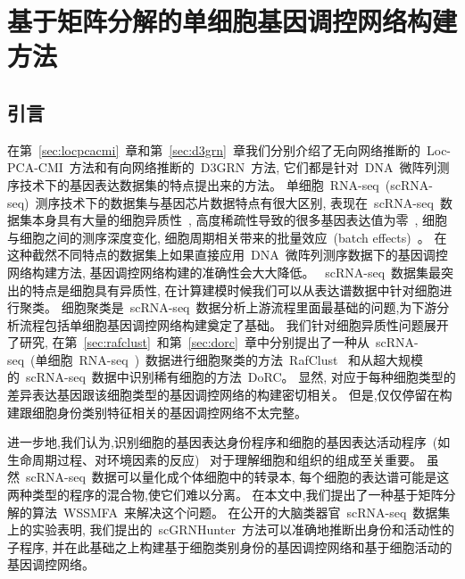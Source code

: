 \section{基于矩阵分解的单细胞基因调控网络构建方法}
\label{sec:scgrnhunter}

\subsection{引言}

在第~\ref{sec:locpcacmi}~章和第~\ref{sec:d3grn}~章我们分别介绍了无向网络推断的~Loc-PCA-CMI~方法和有向网络推断的~D3GRN~方法, 
它们都是针对~DNA~微阵列测序技术下的基因表达数据集的特点提出来的方法。
单细胞~RNA-seq~(scRNA-seq)~测序技术下的数据集与基因芯片数据特点有很大区别, 
表现在~scRNA-seq~数据集本身具有大量的细胞异质性~\cite{wagner2016revealing},
高度稀疏性导致的很多基因表达值为零~\cite{vallejos2017normalizing},
细胞与细胞之间的测序深度变化, 细胞周期相关带来的批量效应~(batch effects)~\cite{buettner2015computational}。
在这种截然不同特点的数据集上如果直接应用~DNA~微阵列测序数据下的基因调控网络构建方法,
基因调控网络构建的准确性会大大降低。
~scRNA-seq~数据集最突出的特点是细胞具有异质性,
在计算建模时候我们可以从表达谱数据中针对细胞进行聚类。
细胞聚类是~scRNA-seq~数据分析上游流程里面最基础的问题,为下游分析流程包括单细胞基因调控网络构建奠定了基础。
我们针对细胞异质性问题展开了研究,
在第~\ref{sec:rafclust}~和第~\ref{sec:dorc}~章中分别提出了一种从~scRNA-seq~(单细胞~RNA-seq~)~数据进行细胞聚类的方法~RafClust~
和从超大规模的~scRNA-seq~数据中识别稀有细胞的方法~DoRC。
显然, 对应于每种细胞类型的差异表达基因跟该细胞类型的基因调控网络的构建密切相关。
但是,仅仅停留在构建跟细胞身份类别特征相关的基因调控网络不太完整。


进一步地,我们认为,识别细胞的基因表达身份程序和细胞的基因表达活动程序~(如生命周期过程、对环境因素的反应)~
对于理解细胞和组织的组成至关重要。
虽然~scRNA-seq~数据可以量化成个体细胞中的转录本,
每个细胞的表达谱可能是这两种类型的程序的混合物,使它们难以分离。
在本文中,我们提出了一种基于矩阵分解的算法~WSSMFA~来解决这个问题。
在公开的大脑类器官~scRNA-seq~数据集上的实验表明,
我们提出的~scGRNHunter~方法可以准确地推断出身份和活动性的子程序, 
并在此基础之上构建基于细胞类别身份的基因调控网络和基于细胞活动的基因调控网络。

